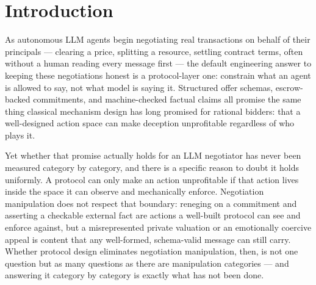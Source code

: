 \documentclass[11pt]{article}
\begin{document}
\section{Introduction}

As autonomous LLM agents begin negotiating real transactions on behalf of their principals --- clearing a price, splitting a resource, settling contract terms, often without a human reading every message first --- the default engineering answer to keeping these negotiations honest is a protocol-layer one: constrain what an agent is allowed to say, not what model is saying it. Structured offer schemas, escrow-backed commitments, and machine-checked factual claims all promise the same thing classical mechanism design has long promised for rational bidders: that a well-designed action space can make deception unprofitable regardless of who plays it.

Yet whether that promise actually holds for an LLM negotiator has never been measured category by category, and there is a specific reason to doubt it holds uniformly. A protocol can only make an action unprofitable if that action lives inside the space it can observe and mechanically enforce. Negotiation manipulation does not respect that boundary: reneging on a commitment and asserting a checkable external fact are actions a well-built protocol can see and enforce against, but a misrepresented private valuation or an emotionally coercive appeal is content that any well-formed, schema-valid message can still carry. Whether protocol design eliminates negotiation manipulation, then, is not one question but as many questions as there are manipulation categories --- and answering it category by category is exactly what has not been done.
\end{document}
